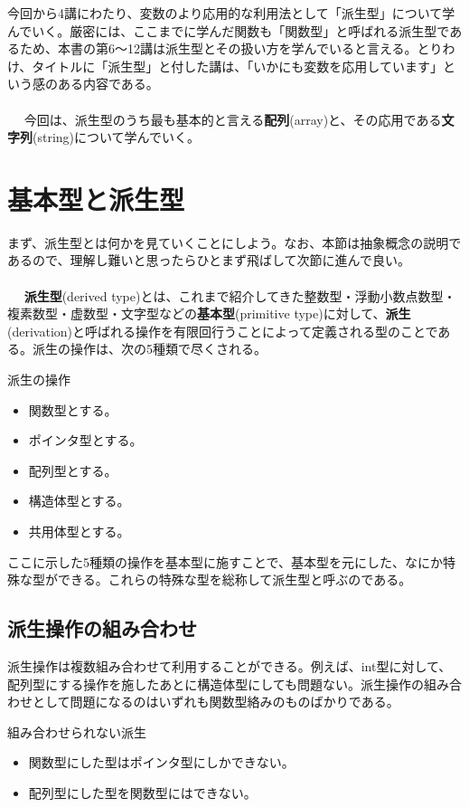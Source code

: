 今回から4講にわたり、変数のより応用的な利用法として「派生型」について学んでいく。厳密には、ここまでに学んだ関数も「関数型」と呼ばれる派生型であるため、本書の第6〜12講は派生型とその扱い方を学んでいると言える。とりわけ、タイトルに「派生型」と付した講は、「いかにも変数を応用しています」という感のある内容である。
\\ \\　
今回は、派生型のうち最も基本的と言える\textbf{配列}(array)と、その応用である\textbf{文字列}(string)について学んでいく。
\section{基本型と派生型}
まず、派生型とは何かを見ていくことにしよう。なお、本節は抽象概念の説明であるので、理解し難いと思ったらひとまず飛ばして次節に進んで良い。
\\ \\　
\textbf{派生型}(derived type)とは、これまで紹介してきた整数型・浮動小数点数型・複素数型・虚数型・文字型などの\textbf{基本型}(primitive type)に対して、\textbf{派生}(derivation)と呼ばれる操作を有限回行うことによって定義される型のことである。派生の操作は、次の5種類で尽くされる。
\begin{itembox}[l]{派生の操作}
\begin{itemize}
\item 関数型とする。
\item ポインタ型とする。
\item 配列型とする。
\item 構造体型とする。
\item 共用体型とする。
\end{itemize}
\end{itembox}

ここに示した5種類の操作を基本型に施すことで、基本型を元にした、なにか特殊な型ができる。これらの特殊な型を総称して派生型と呼ぶのである。

\subsection{派生操作の組み合わせ}
派生操作は複数組み合わせて利用することができる。例えば、int型に対して、配列型にする操作を施したあとに構造体型にしても問題ない。派生操作の組み合わせとして問題になるのはいずれも関数型絡みのものばかりである。
\begin{itembox}[l]{組み合わせられない派生}
\begin{itemize}
\item 関数型にした型はポインタ型にしかできない。
\item 配列型にした型を関数型にはできない。
\end{itemize}
\end{itembox}

